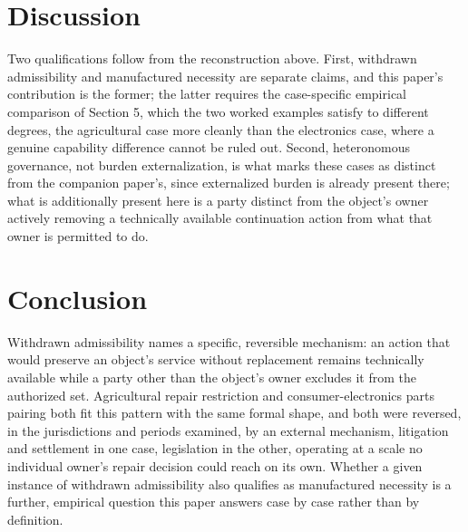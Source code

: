 \documentclass[11pt]{article}
\begin{document}
\section{Discussion}

Two qualifications follow from the reconstruction above. First, withdrawn admissibility and manufactured necessity are separate claims, and this paper's contribution is the former; the latter requires the case-specific empirical comparison of Section 5, which the two worked examples satisfy to different degrees, the agricultural case more cleanly than the electronics case, where a genuine capability difference cannot be ruled out. Second, heteronomous governance, not burden externalization, is what marks these cases as distinct from the companion paper's, since externalized burden is already present there; what is additionally present here is a party distinct from the object's owner actively removing a technically available continuation action from what that owner is permitted to do.

\section{Conclusion}

Withdrawn admissibility names a specific, reversible mechanism: an action that would preserve an object's service without replacement remains technically available while a party other than the object's owner excludes it from the authorized set. Agricultural repair restriction and consumer-electronics parts pairing both fit this pattern with the same formal shape, and both were reversed, in the jurisdictions and periods examined, by an external mechanism, litigation and settlement in one case, legislation in the other, operating at a scale no individual owner's repair decision could reach on its own. Whether a given instance of withdrawn admissibility also qualifies as manufactured necessity is a further, empirical question this paper answers case by case rather than by definition.
\end{document}
